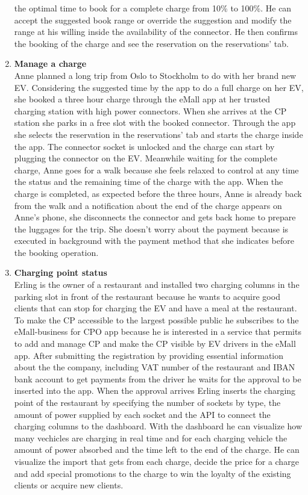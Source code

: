\begin{enumerate}[label=\textbf{\Alph*}.]
            the optimal time to book for a complete charge from 10\% to 100\%.
            He can accept the suggested book range or override the suggestion and modify the range at his willing inside the
            availability of the connector. He then confirms the booking of the charge and see the reservation on the reservations' tab.
      \item \textbf{Manage a charge} \\
            Anne planned a long trip from Oslo to Stockholm to do with her brand new EV.
            Considering the suggested time by the app to do a full charge on her EV, she booked a three hour charge through the eMall
            app at her trusted charging station with high power connectors.
            When she arrives at the CP station she parks in a free slot with the booked connector. Through the app she selects
            the reservation in the reservations' tab and starts the charge inside the app. The connector socket is unlocked and
            the charge can start by plugging the connector on the EV. Meanwhile waiting for the complete charge, Anne goes for a walk
            because she feels relaxed to control at any time the status and the remaining time of the charge with the app. When the charge
            is completed, as expected before the three hours, Anne is already back from the walk and a notification about the end of the charge
            appears on Anne's phone, she disconnects the connector and gets back home to prepare the luggages for the trip. She doesn't worry about
            the payment because is executed in background with the payment method that she indicates before the booking operation.
      \item \textbf{Charging point status} \\
            Erling is the owner of a restaurant and installed two charging columns in the parking slot in front of the restaurant because
            he wants to acquire good clients that can stop for charging the EV and have a meal at the restaurant. To make the CP accessible to the largest
            possible public he subscribes to the eMall-business for CPO app because he is interested in a service that permits to add and manage CP and make
            the CP visible by EV drivers in the eMall app. After submitting the registration by providing essential information about the the company, including
            VAT number of the restaurant and IBAN bank account to get payments from the driver he waits for the approval to be inserted into the app.
            When the approval arrives Erling inserts the charging point of the restaurant by specifying the number of sockets by type, the amount of power supplied by
            each socket and the API to connect the charging columns to the dashboard. With the dashboard he can visualize how many vechicles are charging in real time
            and for each charging vehicle the amount of power absorbed and the time left to the end of the charge. He can visualize the import that gets from each
            charge, decide the price for a charge and add special promotions to the charge to win the loyalty of the existing clients or acquire new clients.
\end{enumerate}

